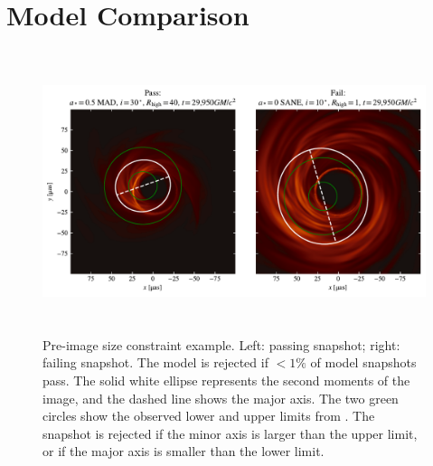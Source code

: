 \section{Model Comparison}\label{sec:comparisons}

\begin{figure}
  \centering
  \includegraphics[height=3.25in]{figures/passfail_sz.pdf}
  \caption{Pre-image size constraint example.
    Left: passing snapshot;
    right: failing snapshot.
    The model is rejected if $< 1\%$ of model snapshots pass.
    The solid white ellipse  represents the second moments of the image, and the dashed line shows the major axis.
    The two green circles show the observed lower and upper limits from .
    The snapshot is rejected if the minor axis is larger than the upper limit, or if the major axis is smaller than the lower limit.}
  \label{fig:passfail_sz}
\end{figure}

